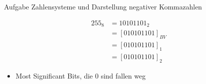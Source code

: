 \begin{frame}[allowframebreaks]{Aufgabe \thesection}{Zahlensysteme und Darstellung negativer Kommazahlen}
  \begin{solutionnoinc}
    \begin{align*}
      255_{8} &= 10 101 101_2\\ 
      &= [010 101 101]_{BV} \\ 
      &= [010 101 101]_{1} \\ 
      &= [010 101 101]_{2}
    \end{align*}
  \end{solutionnoinc}
  \begin{Sidenote}
    \begin{itemize}
      \item Most Significant Bits, die $0$ sind fallen weg
    \end{itemize}
  \end{Sidenote}
\end{frame}
